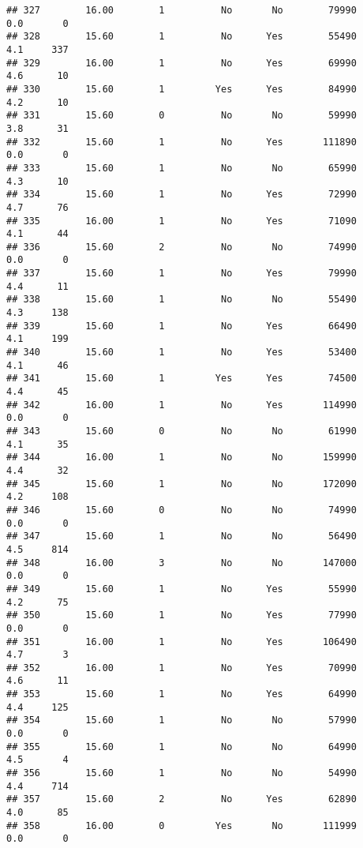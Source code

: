\documentclass[
]{article}
\begin{document}
\begin{verbatim}
## 327        16.00        1          No       No        79990         0.0       0
## 328        15.60        1          No      Yes        55490         4.1     337
## 329        16.00        1          No      Yes        69990         4.6      10
## 330        15.60        1         Yes      Yes        84990         4.2      10
## 331        15.60        0          No       No        59990         3.8      31
## 332        15.60        1          No      Yes       111890         0.0       0
## 333        15.60        1          No       No        65990         4.3      10
## 334        15.60        1          No      Yes        72990         4.7      76
## 335        16.00        1          No      Yes        71090         4.1      44
## 336        15.60        2          No       No        74990         0.0       0
## 337        15.60        1          No      Yes        79990         4.4      11
## 338        15.60        1          No       No        55490         4.3     138
## 339        15.60        1          No      Yes        66490         4.1     199
## 340        15.60        1          No      Yes        53400         4.1      46
## 341        15.60        1         Yes      Yes        74500         4.4      45
## 342        16.00        1          No      Yes       114990         0.0       0
## 343        15.60        0          No       No        61990         4.1      35
## 344        16.00        1          No       No       159990         4.4      32
## 345        15.60        1          No       No       172090         4.2     108
## 346        15.60        0          No       No        74990         0.0       0
## 347        15.60        1          No       No        56490         4.5     814
## 348        16.00        3          No       No       147000         0.0       0
## 349        15.60        1          No      Yes        55990         4.2      75
## 350        15.60        1          No      Yes        77990         0.0       0
## 351        16.00        1          No      Yes       106490         4.7       3
## 352        16.00        1          No      Yes        70990         4.6      11
## 353        15.60        1          No      Yes        64990         4.4     125
## 354        15.60        1          No       No        57990         0.0       0
## 355        15.60        1          No       No        64990         4.5       4
## 356        15.60        1          No       No        54990         4.4     714
## 357        15.60        2          No      Yes        62890         4.0      85
## 358        16.00        0         Yes       No       111999         0.0       0

\end{verbatim}
\end{document}
